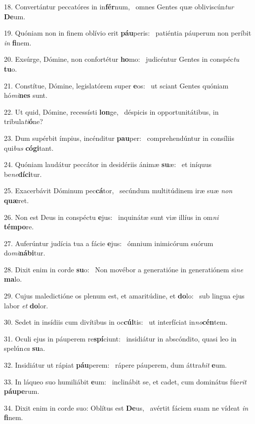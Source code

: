 18. Convertántur peccatóres in in\textbf{fér}num, \ast\  omnes Gentes quæ obliviscún\textit{tur} \textbf{De}um.\

19. Quóniam non in finem oblívio erit \textbf{páu}peris: \ast\  patiéntia páuperum non períbit \textit{in} \textbf{fi}nem.\

20. Exsúrge, Dómine, non confortétur \textbf{ho}mo: \ast\  judicéntur Gentes in conspéc\textit{tu} \textbf{tu}o.\

21. Constítue, Dómine, legislatórem super \textbf{e}os: \ast\  ut sciant Gentes quóniam hó\textit{mi}\textbf{nes} sunt.\

22. Ut quid, Dómine, recessísti \textbf{lon}ge, \ast\  déspicis in opportunitátibus, in tribula\textit{ti}\textbf{ó}ne?\

23. Dum supérbit ímpius, incénditur \textbf{pau}per: \ast\  comprehendúntur in consíliis qui\textit{bus} \textbf{có}\textbf{gi}tant.\

24. Quóniam laudátur peccátor in desidériis ánimæ \textbf{su}æ: \ast\  et iníquus be\textit{ne}\textbf{dí}\textbf{ci}tur.\

25. Exacerbávit Dóminum pec\textbf{cá}tor, \ast\  secúndum multitúdinem iræ suæ \textit{non} \textbf{quæ}ret.\

26. Non est Deus in conspéctu \textbf{e}jus: \ast\  inquinátæ sunt viæ illíus in om\textit{ni} \textbf{tém}\textbf{po}re.\

27. Auferúntur judícia tua a fácie \textbf{e}jus: \ast\  ómnium inimicórum suórum do\textit{mi}\textbf{ná}\textbf{bi}tur.\

28. Dixit enim in corde \textbf{su}o: \ast\  Non movébor a generatióne in generatiónem si\textit{ne} \textbf{ma}lo.\

29. Cujus maledictióne os plenum est, et amaritúdine, et \textbf{do}lo: \ast\  sub lingua ejus labor \textit{et} \textbf{do}lor.\

30. Sedet in insídiis cum divítibus in oc\textbf{cúl}tis: \ast\  ut interfíciat in\textit{no}\textbf{cén}tem.\

31. Oculi ejus in páuperem re\textbf{spí}ciunt: \ast\  insidiátur in abscóndito, quasi leo in spelún\textit{ca} \textbf{su}a.\

32. Insidiátur ut rápiat \textbf{páu}perem: \ast\  rápere páuperem, dum áttra\textit{hit} \textbf{e}um.\

33. In láqueo suo humiliábit \textbf{e}um: \ast\  inclinábit se, et cadet, cum dominátus fúe\textit{rit} \textbf{páu}\textbf{pe}rum.\

34. Dixit enim in corde suo: Oblítus est \textbf{De}us, \ast\  avértit fáciem suam ne vídeat \textit{in} \textbf{fi}nem.\

